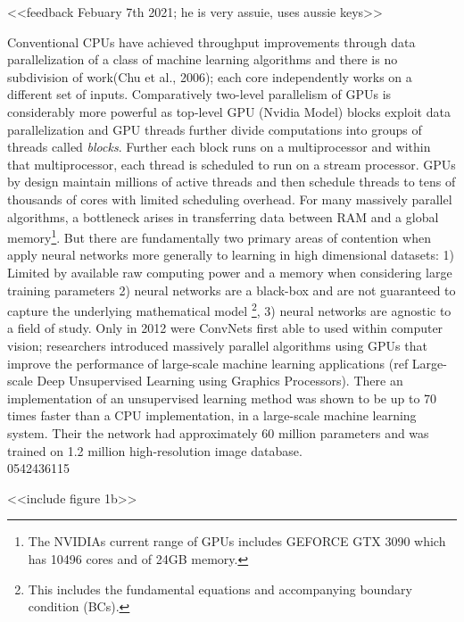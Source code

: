 \documentclass[7pt]{article}
\begin{document}
 <<feedback Febuary 7th 2021; he is very assuie, uses aussie keys>>
 
 Conventional CPUs have achieved throughput improvements through data parallelization of a class of machine learning algorithms and there is no subdivision of work(Chu et al., 2006);  each core independently works on a different set of inputs. Comparatively two-level parallelism of GPUs is considerably more powerful as top-level GPU (Nvidia Model) blocks   exploit data parallelization and GPU threads further divide computations into groups of threads called \emph{blocks}. Further each block runs on a multiprocessor and within that multiprocessor, each thread is scheduled to run on a stream processor. GPUs by design maintain millions of active threads and then schedule threads to tens of thousands of cores with limited scheduling overhead. For many massively parallel algorithms, a bottleneck arises in transferring data between RAM and a global memory\footnote{The NVIDIAs current range of GPUs includes GEFORCE GTX 3090 which has 10496 cores and of 24GB memory.}. But there are fundamentally two primary areas of contention when apply neural networks more generally to learning in high dimensional datasets: 1) Limited by available raw computing power and a memory when considering large training parameters 2) neural networks are a black-box and are not guaranteed to capture the underlying mathematical model \footnote{This includes the fundamental equations and accompanying boundary condition (BCs).}, 3) neural networks are agnostic to a  field of study. Only in 2012 were ConvNets first able to used within computer vision; researchers introduced massively parallel algorithms using GPUs that improve the performance of large-scale machine learning applications (ref Large-scale Deep Unsupervised Learning using Graphics Processors). There an implementation of an unsupervised learning method was shown to be up to 70 times faster than a CPU implementation, in a large-scale machine learning system. Their the network had approximately 60 million parameters and was trained on 1.2 million high-resolution image database.\\
 

 
 0542436115
 
<<include figure 1b>>
\end{document}

